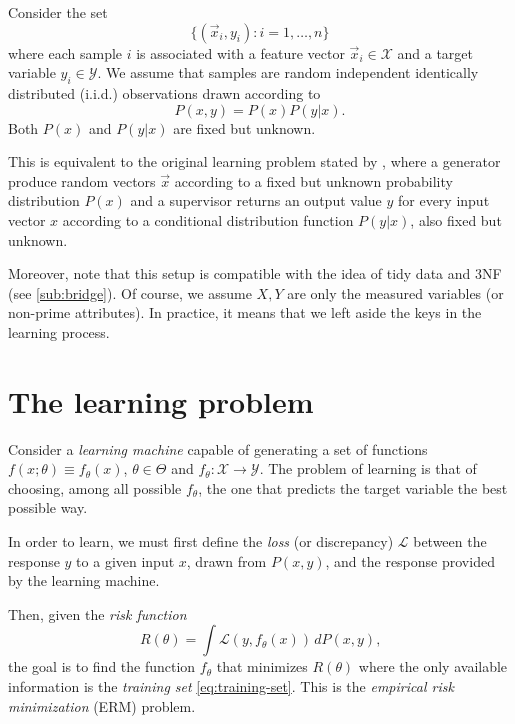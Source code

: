 Consider the set
\begin{equation}
  \label{eq:training-set}
  \big\{(\vec{x}_i, y_i) : i = 1, \dots, n \big\}
\end{equation}
where each sample $i$ is associated with a feature vector $\vec{x}_i \in \mathcal{X}$ and a target variable
$y_i \in \mathcal{Y}$.  We assume that samples are random independent identically
distributed (i.i.d.) observations drawn according to $$P(x, y) = P(x) P(y | x)\text{.}$$
Both $P(x)$ and $P(y|x)$ are fixed but unknown.

This is equivalent to the original learning problem stated by \textcite{Vapnik1999b}, where
a generator produce random vectors $\vec{x}$ according to a fixed but unknown
probability distribution $P(x)$ and a supervisor returns an output value $y$ for every
input vector $x$ according to a conditional distribution function $P(y|x)$, also fixed but
unknown.

Moreover, note that this setup is compatible with the idea of tidy data and 3NF (see
\cref{sub:bridge}). Of course, we assume $X, Y$ are only the measured variables (or
non-prime attributes).  In practice, it means that we left aside the keys in the learning
process.

\section{The learning problem}

Consider a \emph{learning machine} capable of generating a set of functions $f(x;
\theta) \equiv f_\theta(x)$, $\theta \in \Theta$ and $f_\theta : \mathcal{X} \rightarrow \mathcal{Y}$.
The problem of learning is that of choosing, among all possible $f_\theta$, the one that
predicts the target variable the best possible way.

In order to learn, we must first define the \emph{loss} (or discrepancy) $\mathcal{L}$
between the response $y$ to a given input $x$, drawn from $P(x, y)$, and the
response provided by the learning machine.

Then, given the \emph{risk function}
\begin{equation}
  \label{eq:risk}
  R(\theta) = \int \mathcal{L}(y, f_\theta(x))\, dP(x, y)\text{,}
\end{equation}
the goal is to find the function $f_\theta$ that minimizes $R(\theta)$
where the only available information is the \emph{training set} \eqref{eq:training-set}.
This is the \emph{empirical risk minimization} (ERM) problem.

